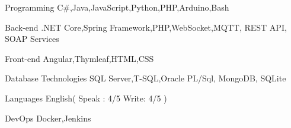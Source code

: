 

\begin{cvskills}

  \cvskill
    {Programming} %
    {C\#,Java,JavaScript,Python,PHP,Arduino,Bash} %

  \cvskill
    {Back-end} %
    {.NET Core,Spring Framework,PHP,WebSocket,MQTT, REST API, SOAP Services} %

  \cvskill
    {Front-end} %
    {Angular,Thymleaf,HTML,CSS} %

  \cvskill
    {Database Technologies} %
    {SQL Server,T-SQL,Oracle PL/Sql, MongoDB, SQLite} %


  \cvskill
    {Languages} %
    {English( Speak : 4/5 Write: 4/5 )} %

  \cvskill
    {DevOps} %
    {Docker,Jenkins} %

\end{cvskills}
